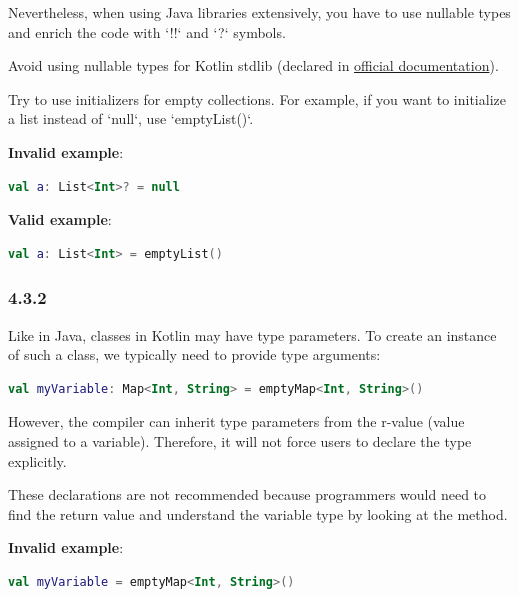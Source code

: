 {{{{Nevertheless, when using Java libraries extensively, you have to use nullable types and enrich the code with `!!` and `?` symbols.

Avoid using nullable types for Kotlin stdlib (declared in \href{https://kotlinlang.org/api/latest/jvm/stdlib/kotlin.collections/}{official documentation}). 

Try to use initializers for empty collections. For example, if you want to initialize a list instead of `null`, use `emptyList()`.



\textbf{Invalid example}:

\begin{lstlisting}[language=Kotlin]
val a: List<Int>? = null 
\end{lstlisting}


\textbf{Valid example}:

\begin{lstlisting}[language=Kotlin]
val a: List<Int> = emptyList()
\end{lstlisting}


\subsubsection*{\textbf{4.3.2}}
\leavevmode\newline

\label{sec:4.3.2}

Like in Java, classes in Kotlin may have type parameters. To create an instance of such a class, we typically need to provide type arguments:



\begin{lstlisting}[language=Kotlin]
val myVariable: Map<Int, String> = emptyMap<Int, String>() 
\end{lstlisting}


However, the compiler can inherit type parameters from the r-value (value assigned to a variable). Therefore, it will not force users to declare the type explicitly.

These declarations are not recommended because programmers would need to find the return value and understand the variable type by looking at the method.



\textbf{Invalid example}:

\begin{lstlisting}[language=Kotlin]
val myVariable = emptyMap<Int, String>() 
\end{lstlisting}


}}}}
